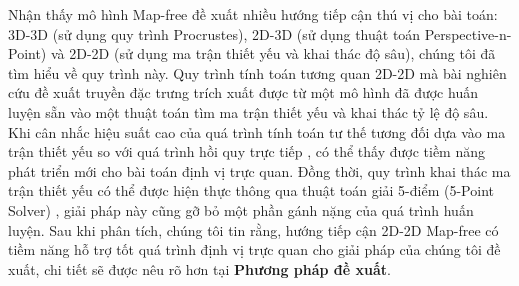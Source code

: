 Nhận thấy mô hình Map-free \cite{arnold2022mapfree} đề xuất nhiều hướng tiếp cận thú vị cho bài toán: 3D-3D (sử dụng quy trình Procrustes), 2D-3D (sử dụng thuật toán Perspective-n-Point) và 2D-2D (sử dụng ma trận thiết yếu và khai thác độ sâu), chúng tôi đã tìm hiểu về quy trình này. Quy trình tính toán tương quan 2D-2D mà bài nghiên cứu đề xuất truyền đặc trưng trích xuất được từ một mô hình đã được huấn luyện sẵn vào một thuật toán tìm ma trận thiết yếu và khai thác tỷ lệ độ sâu. Khi cân nhắc hiệu suất cao của quá trình tính toán tư thế tương đối dựa vào ma trận thiết yếu so với quá trình hồi quy trực tiếp \cite{sattler2019understanding}, có thể thấy được tiềm năng phát triển mới cho bài toán định vị trực quan. Đồng thời, quy trình khai thác ma trận thiết yếu có thể được hiện thực thông qua thuật toán giải 5-điểm (5-Point Solver) \cite{nister2004efficient}, giải pháp này cũng gỡ bỏ một phần gánh nặng của quá trình huấn luyện. Sau khi phân tích, chúng tôi tin rằng, hướng tiếp cận 2D-2D Map-free có tiềm năng hỗ trợ tốt quá trình định vị trực quan cho giải pháp của chúng tôi đề xuất, chi tiết sẽ được nêu rõ hơn tại \textbf{Phương pháp đề xuất}.
